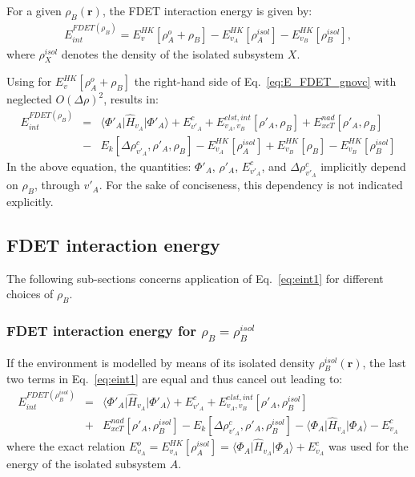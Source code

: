 \documentclass[amsmath,amssymb,preprint,aip,jcp]{revtex4-1}
\begin{document}
For a given $\rho_B(\mathbf{r})$,
the FDET interaction energy is given by:
\begin{eqnarray}
E_{int}^{FDET(\rho_B)}=E_{v}^{HK}[\rho_A^{o}+\rho_B] - E_{v_A}^{HK}[\rho_A^{isol}] - 
E_{v_B}^{HK}[\rho_B^{isol}], \label{eq:eint0}
\end{eqnarray}
where $\rho_X^{isol}$ denotes the density of the isolated subsystem $X$.

Using for $E_{v}^{HK}[\rho_A^{o}+\rho_B]$ the right-hand side of Eq.~\ref{eq:E_FDET_gnovc} with neglected $O(\Delta\rho)^2$, results in:
\begin{eqnarray}
E_{int}^{FDET(\rho_B)}&=&
\langle\Phi'_{A}\vert \hat{H}_{v_A}\vert \Phi'_{A}\rangle + E^{c}_{v'_A}
+ E^{elst,int}_{v_A,v_B}[\rho'_A,\rho_B] + {E}_{xcT}^{nad}[\rho'_A,\rho_B] \label{eq:eint1}\\
&-& E_k[\Delta \rho^{c}_{v'_A}, \rho'_A, \rho_B] - E_{v_A}^{HK}[\rho_A^{isol}] + {E}^{HK}_{v_B}[\rho_B] - 
E_{v_B}^{HK}[\rho_B^{isol}] \nonumber
\end{eqnarray}
In the above equation, the quantities: $\Phi'_{A}$, $\rho'_A$, $E^{c}_{v'_A}$, and $\Delta \rho^{c}_{v'_A}$ implicitly depend on $\rho_B$, through $v'_A$. For the sake of conciseness, this dependency is not indicated explicitly. 
\subsection{FDET interaction energy}
The following sub-sections concerns application of Eq.~\ref{eq:eint1} for different choices of $\rho_B$. 
\subsubsection{FDET interaction energy for $\rho_B=\rho_B^{isol}$}
If the environment is modelled by means of its isolated density $\rho_B^{isol}(\mathbf{r})$, the last two terms in Eq.~\ref{eq:eint1} are equal and thus cancel out leading to:
\begin{eqnarray}
E_{int}^{FDET(\rho_B^{isol})}&=&
\langle\Phi'_{A}\vert \hat{H}_{v_A}\vert \Phi'_{A}\rangle + E^{c}_{v'_A}
+ E^{elst,int}_{v_A,v_B}[\rho'_A,\rho_B^{isol}] \label{eq:eint2}\\
&+& {E}_{xcT}^{nad}[\rho'_A,\rho_B^{isol}] - E_k[\Delta \rho^{c}_{v'_A}, \rho'_A, \rho_B^{isol}] - 
\langle\Phi_{A}\vert \hat{H}_{v_A}\vert \Phi_{A}\rangle - E^{c}_{v_A}
\nonumber
\end{eqnarray}
where the exact relation $E_{v_A}^o=E_{v_A}^{HK}[\rho_A^{isol}]=\langle\Phi_{A}\vert \hat{H}_{v_A}\vert \Phi_{A}\rangle + E^{c}_{v_A}$ was used for the energy of the isolated subsystem $A$.
\end{document}
